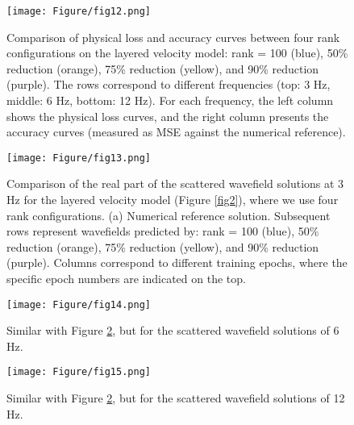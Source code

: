 \begin{figure}[htbp]
\centering
\texttt{[image: Figure/fig12.png]}
\caption{Comparison of physical loss and accuracy curves between four rank configurations on the layered velocity model: rank = 100 (blue), 50\% reduction (orange), 75\% reduction (yellow), and 90\% reduction (purple). The rows correspond to different frequencies (top: 3 Hz, middle: 6 Hz, bottom: 12 Hz). For each frequency, the left column shows the physical loss curves, and the right column presents the accuracy curves (measured as MSE against the numerical reference).}
\label{fig12}
\end{figure}

\begin{figure}[htbp]
\centering
\texttt{[image: Figure/fig13.png]}
\caption{Comparison of the real part of the scattered wavefield solutions at 3 Hz for the layered velocity model (Figure \ref{fig2}), where we use four rank configurations. (a) Numerical reference solution. Subsequent rows represent wavefields predicted by: rank = 100 (blue), 50\% reduction (orange), 75\% reduction (yellow), and 90\% reduction (purple). Columns correspond to different training epochs, where the specific epoch numbers are indicated on the top.}
\label{fig13}
\end{figure}

\begin{figure}[htbp]
\centering
\texttt{[image: Figure/fig14.png]}
\caption{Similar with Figure \ref{fig13}, but for the scattered wavefield solutions of 6 Hz.}
\label{fig14}
\end{figure}

\begin{figure}[htbp]
\centering
\texttt{[image: Figure/fig15.png]}
\caption{Similar with Figure \ref{fig13}, but for the scattered wavefield solutions of 12 Hz.}
\label{fig15}
\end{figure}

